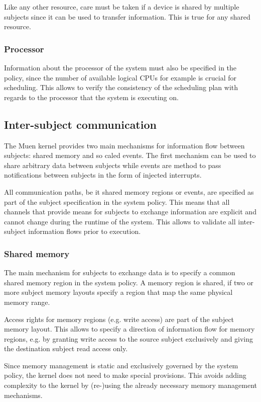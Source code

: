 Like any other resource, care must be taken if a device is shared by multiple
subjects since it can be used to transfer information. This is true for any
shared resource.

\subsubsection{Processor}
Information about the processor of the system must also be specified in the
policy, since the number of available logical CPUs for example is crucial for
scheduling. This allows to verify the consistency of the scheduling plan with
regards to the processor that the system is executing on.

\subsection{Inter-subject communication}
The Muen kernel provides two main mechanisms for information flow between
subjects: shared memory and so caled events. The first mechanism can be used to
share arbitrary data between subjects while events are method to pass
notifications between subjects in the form of injected interrupts.

All communication paths, be it shared memory regions or events, are specified as
part of the subject specification in the system policy. This means that all
channels that provide means for subjects to exchange information are explicit
and cannot change during the runtime of the system. This allows to validate all
inter-subject information flows prior to execution.

\subsubsection{Shared memory}
The main mechanism for subjects to exchange data is to specify a common shared
memory region in the system policy. A memory region is shared, if two or more
subject memory layouts specify a region that map the same physical memory range.

Access rights for memory regions (e.g. write access) are part of the subject
memory layout. This allows to specify a direction of information flow for memory
regions, e.g. by granting write access to the source subject exclusively and
giving the destination subject read access only.

Since memory management is static and exclusively governed by the system policy,
the kernel does not need to make special provisions. This avoids adding
complexity to the kernel by (re-)using the already necessary memory management
mechanisms.


